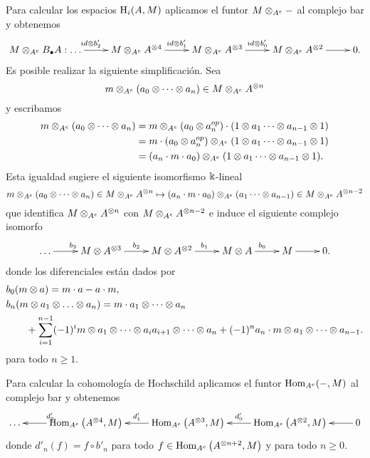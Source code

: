 \documentclass[a4paper,oneside,fleqn,11pt,../tesis.tex]{subfiles}
\begin{document}
Para calcular los espacios $\operatorname{H}_i(A,M)$ aplicamos el funtor $M\otimes_{A^e}-$ al complejo bar y obtenemos
\begin{align*}
	\xymatrix{
		M \ox_{A^e} B_{\bullet}A:\ldots \ar[r]^{id\ox b'_{2}} & M\ox_{A^e}A^{\ox 4} \ar[r]^{id\ox b'_{1}} & M \ox_{A^e}A^{\ox 3} \ar[r]^{id\ox b'_{0}} & M\ox_{A^e}A^{\ox 2} \ar[r] & 0.
	}
\end{align*}
Es posible realizar la siguiente simplificación. Sea
\[
	m\otimes_{A^e}(a_0 \otimes \cdots \otimes a_n) \in  M\otimes_{A^e}A^{\otimes n}
\]
y escribamos
\begin{align*}
	m\otimes_{A^e}(a_0 \otimes \cdots \otimes a_n) &= m\otimes_{A^e}(a_0 \otimes a_{n}^{op}) \cdot (1 \otimes a_1 \cdots \otimes a_{n -1} \otimes 1) \\
		&=m \cdot(a_0 \otimes a_{n}^{op})\otimes_{A^e}(1 \otimes a_1 \cdots \otimes a_{n -1} \otimes 1) \\
		&= \left( a_n \cdot m \cdot a_0\right) \otimes_{A^e}(1 \otimes a_1 \cdots \otimes a_{n -1} \otimes 1).
\end{align*}
Esta igualdad sugiere el siguiente isomorfismo $\Bbbk$-lineal
\[
	m\otimes_{A^e}(a_0 \otimes \cdots \otimes a_n) \in  M\otimes_{A^e}A^{\otimes n} \mapsto
		\left( a_n \cdot m \cdot a_0\right) \otimes_{A^e}(a_1 \cdots \otimes a_{n -1}) \in M\otimes_{A^e}A^{\otimes n - 2}
\]
que identifica $ M\otimes_{A^e}A^{\otimes n}$ con $M\otimes_{A^e}A^{\otimes n - 2}$ e induce el siguiente complejo isomorfo
\begin{align*}
	\xymatrix{
		\ldots \ar[r]^{b_3} & M\ox A^{\ox 3} \ar[r]^{b_2}  & M\ox A^{\ox 2} \ar[r]^{b_1} & M \ox A \ar[r]^{b_0} & M \ar[r] & 0.
	}
\end{align*}
donde los diferenciales están dados por
\begin{align*}
	&b_0(m\otimes a) = m\cdot a - a\cdot m,\\
	&b_n(m\otimes a_1 \otimes \ldots \otimes a_n) = m \cdot a_1 \otimes \cdots \otimes a_n \\
		 &\qquad + \sum_{i = 1}^{n -1}(-1)^{i} m \otimes a_1 \otimes \cdots \otimes a_i a_{i + 1} \otimes \cdots \otimes a_n
		 	+ (-1)^n a_n \cdot m \otimes a_1 \otimes \cdots \otimes a_{n-1}.
\end{align*}
para todo $n \geq 1$.

Para calcular la cohomología de Hochschild aplicamos el funtor $\operatorname{Hom}_{A^e}(-,M)$ al complejo bar y obtenemos
\begin{align*}
	\xymatrix{
		\ldots & \Hom_{A^e}\left(A^{\ox 4}, M\right) \ar[l]_{d'_2} & \Hom_{A^e}\left(A^{\ox 3}, M\right) \ar[l]_{d'_1}
			& \Hom_{A^e}\left(A^{\ox 2}, M\right) \ar[l]_{d'_0} & 0 \ar[l],
	}
\end{align*}
donde $d'_n(f) = f \circ b'_n$ para todo $f \in \operatorname{Hom}_{A^e}\left(A^{\otimes n + 2}, M\right)$ y para todo $n \geq 0$.
\end{document}
